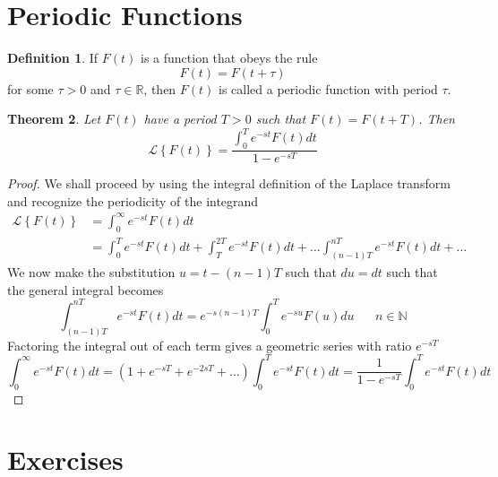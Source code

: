 \documentclass{report}
\newtheorem{theorem}{Theorem}[chapter]
\theoremstyle{definition}
\newtheorem{definition}[theorem]{Definition}
\theoremstyle{remark}
\newcommand{\lapt}[1]{\mathscr{L}\left\{ #1\right\}}
\newcommand{\R}{\mathbb{R}}
\newcommand{\twen}{\hspace{20pt}}
\begin{document}
\section{Periodic Functions}
\begin{definition}
    If $F(t)$ is a function that obeys the rule 
    \begin{equation*}
        F(t) = F(t+\tau)
    \end{equation*}
    for some $\tau >0$ and $\tau \in \R$, then $F(t)$ is called a periodic function with period $\tau$.
\end{definition}
\begin{theorem}
    Let $F(t)$ have a period $T>0$ such that $F(t) = F(t+T)$. Then 
    \begin{equation*}
        \lapt{F(t)}= \frac{\int^T_0 e^{-st}F(t)dt}{1-e^{-sT}}
    \end{equation*}
\end{theorem}
\begin{proof}
    We shall proceed by using the integral definition of the Laplace transform and recognize the periodicity of the integrand 
    \begin{equation*}
    \begin{split}
        \lapt{F(t)} &= \int^\infty_0 e^{-st}F(t)dt \\
        &= \int^T_0 e^{-st}F(t)dt + \int^{2T}_Te^{-st}F(t)dt +\ldots\int^{nT}_{(n-1)T}e^{-st}F(t)dt + \ldots
    \end{split}
    \end{equation*}
    We now make the substitution $u=t-(n-1)T$ such that $du =dt$ such that the general integral becomes
    \begin{equation*}
        \int^{nT}_{(n-1)T} e^{-st}F(t)dt = e^{-s(n-1)T}\int^T_0e^{-su}F(u)du \twen n\in \mathbb{N}
    \end{equation*}
    Factoring the integral out of each term gives a geometric series with ratio $e^{-sT}$
    \begin{equation*}
        \int^\infty_0e^{-st}F(t)dt = (1+e^{-sT}+e^{-2sT}+\ldots) \int^T_0e^{-st}F(t)dt = \frac{1}{1-e^{-sT}}\int^T_0 e^{-st}F(t)dt
    \end{equation*}
\end{proof}
\section{Exercises}
\end{document}
